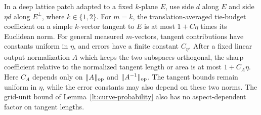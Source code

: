 \begin{lemma}
\label{lt:sharp-grid}
In a deep lattice patch adapted to a fixed $k$-plane $E$, use side
$d$ along $E$ and side $\eta d$ along $E^\perp$, where
$k\in\{1,2\}$.  For $m=k$, the translation-averaged tie-budget
coefficient on a simple $k$-vector tangent to $E$ is at most
$1+C\eta$ times its Euclidean norm.  For general measured
$m$-vectors, tangent contributions have constants uniform in
$\eta$, and errors have a finite constant $C_\eta$.
After a fixed linear output normalization $A$ which keeps the two
subspaces orthogonal, the sharp coefficient relative to the normalized
tangent length or area is at most $1+C_A\eta$. Here $C_A$ depends only on
$\|A\|_{\mathrm{op}}$ and $\|A^{-1}\|_{\mathrm{op}}$. The tangent bounds remain
uniform in $\eta$, while the error constants may also depend on these
two norms.
The grid-unit bound of Lemma~\ref{lt:curve-probability} also has no
aspect-dependent factor on tangent lengths.
\end{lemma}

